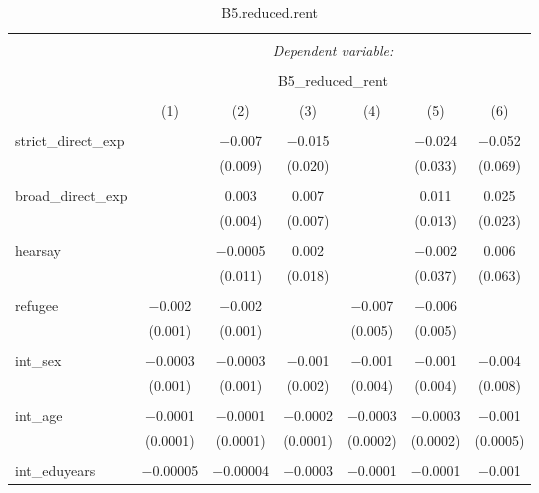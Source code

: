 
\begin{table}[H] \centering 
  \caption{B5.reduced.rent} 
  \label{} 
\tiny 
\begin{tabular}{@{\extracolsep{4pt}}lcccccc} 
\\[-1.8ex]\hline 
\hline \\[-1.8ex] 
 & \multicolumn{6}{c}{\textit{Dependent variable:}} \\ 
\cline{2-7} 
\\[-1.8ex] & \multicolumn{6}{c}{B5\_reduced\_rent} \\ 
\\[-1.8ex] & (1) & (2) & (3) & (4) & (5) & (6)\\ 
\hline \\[-1.8ex] 
 strict\_direct\_exp &  & $-$0.007 & $-$0.015 &  & $-$0.024 & $-$0.052 \\ 
  &  & (0.009) & (0.020) &  & (0.033) & (0.069) \\ 
  & & & & & & \\ 
 broad\_direct\_exp &  & 0.003 & 0.007 &  & 0.011 & 0.025 \\ 
  &  & (0.004) & (0.007) &  & (0.013) & (0.023) \\ 
  & & & & & & \\ 
 hearsay &  & $-$0.0005 & 0.002 &  & $-$0.002 & 0.006 \\ 
  &  & (0.011) & (0.018) &  & (0.037) & (0.063) \\ 
  & & & & & & \\ 
 refugee & $-$0.002 & $-$0.002 &  & $-$0.007 & $-$0.006 &  \\ 
  & (0.001) & (0.001) &  & (0.005) & (0.005) &  \\ 
  & & & & & & \\ 
 int\_sex & $-$0.0003 & $-$0.0003 & $-$0.001 & $-$0.001 & $-$0.001 & $-$0.004 \\ 
  & (0.001) & (0.001) & (0.002) & (0.004) & (0.004) & (0.008) \\ 
  & & & & & & \\ 
 int\_age & $-$0.0001 & $-$0.0001 & $-$0.0002 & $-$0.0003 & $-$0.0003 & $-$0.001 \\ 
  & (0.0001) & (0.0001) & (0.0001) & (0.0002) & (0.0002) & (0.0005) \\ 
  & & & & & & \\ 
 int\_eduyears & $-$0.00005 & $-$0.00004 & $-$0.0003 & $-$0.0001 & $-$0.0001 & $-$0.001 \\ 

\end{tabular}
\end{table}
